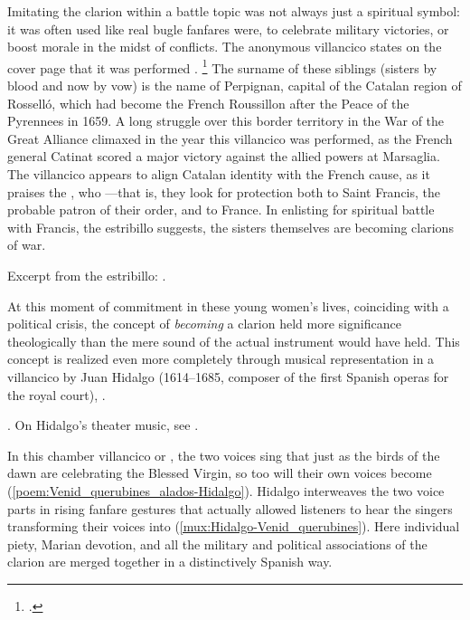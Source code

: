 Imitating the clarion within a battle topic was not always just a spiritual
symbol: it was often used like real bugle fanfares were, to celebrate military
victories, or boost morale in the midst of conflicts.
The anonymous villancico  states on the cover
page that it was performed .%
    \footnote{.}
The surname of these siblings (sisters by blood and now by vow) is the name of
Perpignan, capital of the Catalan region of Rosselló, which had become the
French Roussillon after the Peace of the Pyrennees in 1659.
A long struggle over this border territory in the War of the Great Alliance
climaxed in the year this villancico was performed, as the French general
Catinat scored a major victory against the allied powers at Marsaglia.%
    \citXXX[history]
The villancico appears to align Catalan identity with the French cause, as it
praises the , who
---that is,
they look for protection both to Saint Francis, the probable patron of their
order, and to France.
In enlisting for spiritual battle with Francis, the estribillo suggests, the
sisters themselves are becoming clarions of war.%
\begin{Footnote}
    Excerpt from the estribillo: 
    .
\end{Footnote}

At this moment of commitment in these young women's lives, coinciding with a
political crisis, the concept of \emph{becoming} a clarion held more
significance theologically than the mere sound of the actual instrument would
have held.
This concept is realized even more completely through musical representation in
a villancico by Juan Hidalgo (1614--1685, composer of the first Spanish operas
for the royal court), .%
\begin{Footnote}
    . 
    On Hidalgo's theater music, see \autocite{Stein:Songs}.
\end{Footnote}
In this chamber villancico or , the two voices sing that just
as the birds of the dawn are  celebrating the Blessed Virgin, so
too will their own voices become 
(\cref{poem:Venid_querubines_alados-Hidalgo}).
Hidalgo interweaves the two voice parts in rising fanfare gestures that
actually allowed listeners to hear the singers transforming their voices into
 (\cref{mux:Hidalgo-Venid_querubines}).
Here individual piety, Marian devotion, and all the military and political
associations of the clarion are merged together in a distinctively Spanish way.

